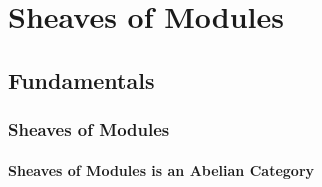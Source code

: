 \documentclass[Total.tex]{subfiles}
\begin{document}
	\chapter{Sheaves of Modules}
	
		\section{Fundamentals}
		\subsection{Sheaves of Modules}
	
		\subsubsection{Sheaves of Modules is an Abelian Category}
		
\end{document}
